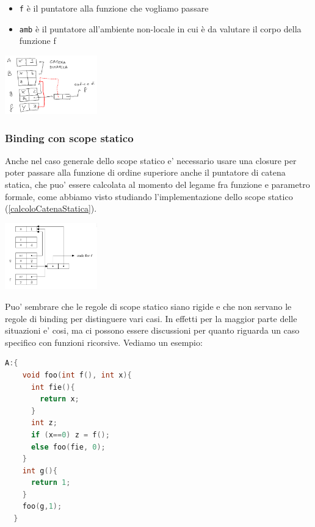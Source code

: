 \begin{itemize}
    \item \texttt{f} è il puntatore alla funzione che vogliamo passare
    \item \texttt{amb} è il puntatore all'ambiente non-locale in cui è da valutare il corpo della funzione f
\end{itemize}

\begin{center}
  \includegraphics[width=0.3\textwidth]{img/2025-03-21-20-30-20.png}
\end{center}

\subsubsection{Binding con scope statico}

Anche nel caso generale dello scope statico e' necessario usare una closure per poter passare alla funzione di ordine superiore anche il puntatore di catena statica, che puo' essere calcolata al momento del legame fra funzione e parametro formale, come abbiamo visto studiando l'implementazione dello scope statico (\ref{calcoloCatenaStatica}).

\begin{center}
  \includegraphics[width=0.3\textwidth]{img/2025-03-21-20-10-23.png}
\end{center}

Puo' sembrare che le regole di scope statico siano rigide e che non servano le regole di binding per distinguere vari casi. In effetti per la maggior parte delle situazioni e' cosi, ma ci possono essere discussioni per quanto riguarda un caso specifico con funzioni ricorsive. Vediamo un esempio:

\begin{lstlisting}[language=C]
  A:{
    void foo(int f(), int x){
      int fie(){
        return x;
      }
      int z;
      if (x==0) z = f();
      else foo(fie, 0);
    }
    int g(){
      return 1;
    }
    foo(g,1);
  }
\end{lstlisting}

